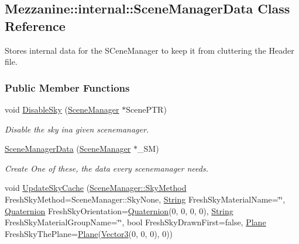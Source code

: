 \hypertarget{classMezzanine_1_1internal_1_1SceneManagerData}{
\subsection{Mezzanine::internal::SceneManagerData Class Reference}
\label{classMezzanine_1_1internal_1_1SceneManagerData}
}


Stores internal data for the SCeneManager to keep it from cluttering the Header file.  


\subsubsection*{Public Member Functions}
\begin{DoxyCompactItemize}
\item 
void \hyperlink{classMezzanine_1_1internal_1_1SceneManagerData_aa5a2252a2c0c8d8736ad2ca1a33d251a}{DisableSky} (\hyperlink{classMezzanine_1_1SceneManager}{SceneManager} $\ast$ScenePTR)
\begin{DoxyCompactList}\small\item\em Disable the sky ina given scenemanager. \item\end{DoxyCompactList}\item 
\hyperlink{classMezzanine_1_1internal_1_1SceneManagerData_ad3efec82c76c38ef90cd8f2fb86a7e60}{SceneManagerData} (\hyperlink{classMezzanine_1_1SceneManager}{SceneManager} $\ast$\_\-SM)
\begin{DoxyCompactList}\small\item\em Create One of these, the data every scenemanager needs. \item\end{DoxyCompactList}\item 
\hypertarget{classMezzanine_1_1internal_1_1SceneManagerData_a58daa2cd7db2ffd13aa6191a481ff26c}{
void \hyperlink{classMezzanine_1_1internal_1_1SceneManagerData_a58daa2cd7db2ffd13aa6191a481ff26c}{UpdateSkyCache} (\hyperlink{classMezzanine_1_1SceneManager_a80fac0c0b67191cb5450bddde74b470e}{SceneManager::SkyMethod} FreshSkyMethod=SceneManager::SkyNone, \hyperlink{namespaceMezzanine_acf9fcc130e6ebf08e3d8491aebcf1c86}{String} FreshSkyMaterialName=\char`\"{}\char`\"{}, \hyperlink{classMezzanine_1_1Quaternion}{Quaternion} FreshSkyOrientation=\hyperlink{classMezzanine_1_1Quaternion}{Quaternion}(0, 0, 0, 0), \hyperlink{namespaceMezzanine_acf9fcc130e6ebf08e3d8491aebcf1c86}{String} FreshSkyMaterialGroupName=\char`\"{}\char`\"{}, bool FreshSkyDrawnFirst=false, \hyperlink{classMezzanine_1_1Plane}{Plane} FreshSkyThePlane=\hyperlink{classMezzanine_1_1Plane}{Plane}(\hyperlink{classMezzanine_1_1Vector3}{Vector3}(0, 0, 0), 0))}
\label{classMezzanine_1_1internal_1_1SceneManagerData_a58daa2cd7db2ffd13aa6191a481ff26c}


\end{DoxyCompactItemize}
